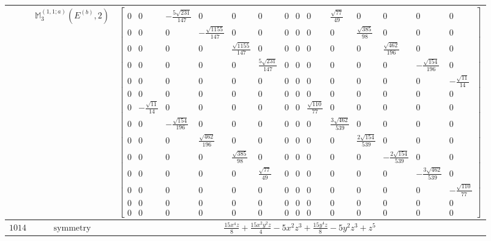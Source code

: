 \documentclass[fleqn,8pt,landscape]{jsarticle}
\begin{document}
\begin{longtable}{ccc}
$  $ & $ \mathbb{M}_{3}^{(1,1;a)}(E^{(b)},2) $ & $ \begin{bmatrix} 0 & 0 & - \frac{5 \sqrt{231}}{147} & 0 & 0 & 0 & 0 & 0 & 0 & \frac{\sqrt{77}}{49} & 0 & 0 & 0 & 0 \\ 0 & 0 & 0 & - \frac{\sqrt{1155}}{147} & 0 & 0 & 0 & 0 & 0 & 0 & \frac{\sqrt{385}}{98} & 0 & 0 & 0 \\ 0 & 0 & 0 & 0 & \frac{\sqrt{1155}}{147} & 0 & 0 & 0 & 0 & 0 & 0 & \frac{\sqrt{462}}{196} & 0 & 0 \\ 0 & 0 & 0 & 0 & 0 & \frac{5 \sqrt{231}}{147} & 0 & 0 & 0 & 0 & 0 & 0 & - \frac{\sqrt{154}}{196} & 0 \\ 0 & 0 & 0 & 0 & 0 & 0 & 0 & 0 & 0 & 0 & 0 & 0 & 0 & - \frac{\sqrt{11}}{14} \\ 0 & 0 & 0 & 0 & 0 & 0 & 0 & 0 & 0 & 0 & 0 & 0 & 0 & 0 \\ 0 & - \frac{\sqrt{11}}{14} & 0 & 0 & 0 & 0 & 0 & 0 & \frac{\sqrt{110}}{77} & 0 & 0 & 0 & 0 & 0 \\ 0 & 0 & - \frac{\sqrt{154}}{196} & 0 & 0 & 0 & 0 & 0 & 0 & \frac{3 \sqrt{462}}{539} & 0 & 0 & 0 & 0 \\ 0 & 0 & 0 & \frac{\sqrt{462}}{196} & 0 & 0 & 0 & 0 & 0 & 0 & \frac{2 \sqrt{154}}{539} & 0 & 0 & 0 \\ 0 & 0 & 0 & 0 & \frac{\sqrt{385}}{98} & 0 & 0 & 0 & 0 & 0 & 0 & - \frac{2 \sqrt{154}}{539} & 0 & 0 \\ 0 & 0 & 0 & 0 & 0 & \frac{\sqrt{77}}{49} & 0 & 0 & 0 & 0 & 0 & 0 & - \frac{3 \sqrt{462}}{539} & 0 \\ 0 & 0 & 0 & 0 & 0 & 0 & 0 & 0 & 0 & 0 & 0 & 0 & 0 & - \frac{\sqrt{110}}{77} \\ 0 & 0 & 0 & 0 & 0 & 0 & 0 & 0 & 0 & 0 & 0 & 0 & 0 & 0 \\ 0 & 0 & 0 & 0 & 0 & 0 & 0 & 0 & 0 & 0 & 0 & 0 & 0 & 0 \end{bmatrix} $ \\ \hline
$ 1014 $ & $ \text{symmetry} $ & $ \frac{15 x^{4} z}{8} + \frac{15 x^{2} y^{2} z}{4} - 5 x^{2} z^{3} + \frac{15 y^{4} z}{8} - 5 y^{2} z^{3} + z^{5} $ \\

\end{longtable}
\end{document}
